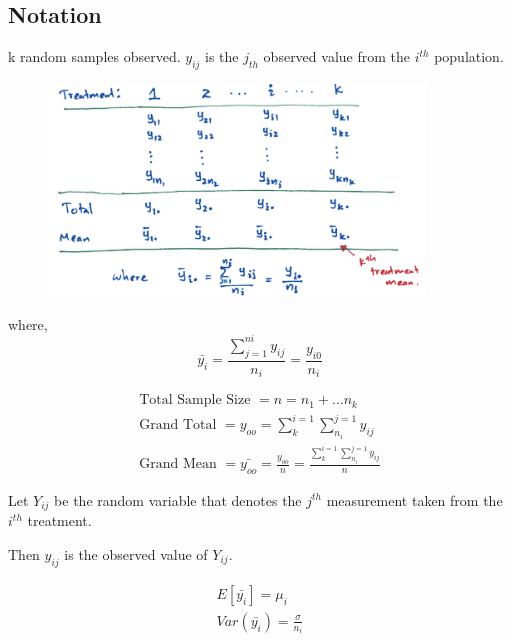 \documentclass{article}
\begin{document}
            \subsection*{Notation}
            k random samples observed.
            $y_{ij}$ is the $j_{th}$ observed value from the $i^{th}$ population.

            \begin{figure}[H]
                \centering
                \includegraphics[width=10cm]{figures/anova_table.PNG}
                \label{fig:anova_table}
            \end{figure}

            where,
            \begin{equation*}
                \bar{y_{i}} = \frac{\sum_{j=1}^{ni} y_{ij}}{n_{i}} = \frac{y_{i0}}{n_{i}}
            \end{equation*}

            \begin{align*}
                \text{Total Sample Size } = n = n_{1} + ...n_{k}\\
                \text{Grand Total } = y_{oo} = \sum_{k}^{i = 1} \sum_{n_{i}}^{j=1}y_{ij}\\
                \text{Grand Mean } = \bar{y_{oo}} = \frac{y_{oo}}{n} = \frac{\sum_{k}^{i = 1} \sum_{n_{i}}^{j=1}y_{ij}}{n} 
            \end{align*}

            Let $Y_{ij}$ be the random variable that denotes the $j^{th}$ measurement 
            taken from the $i^{th}$ treatment.

            Then $y_{ij}$ is the observed value of $Y_{ij}$.

            \begin{align*}
                E[\bar{y_{i}}] = \mu_{i}\\
                Var(\bar{y_{i}}) = \frac{\sigma}{n_{i}}
            \end{align*}
\end{document}
